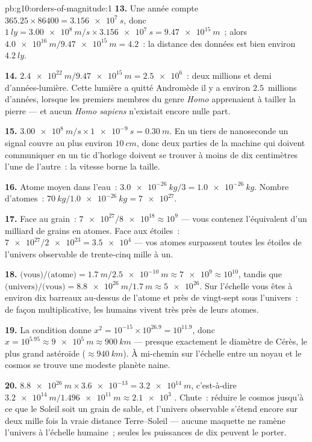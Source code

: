 \begin{solution}{pb:g10:orders-of-magnitude:1}
\textbf{13.} Une année compte $365.25 \times 86400 = \qty{3.156e7}{s}$,
donc $\qty{1}{ly} = \qty{3.00e8}{m/s} \times \qty{3.156e7}{s}
= \qty{9.47e15}{m}$~; alors
$\qty{4.0e16}{m}/\qty{9.47e15}{m} = 4.2$~: la distance des données est
bien environ $\qty{4.2}{ly}$.

\textbf{14.} $\qty{2.4e22}{m}/\qty{9.47e15}{m} = \num{2.5e6}$~: deux
millions et demi d'années-lumière. Cette lumière a quitté
Andromède il y a environ $2.5$~millions d'années, lorsque les premiers
membres du genre \emph{Homo} apprenaient à tailler la pierre --- et
aucun \emph{Homo sapiens} n'existait encore nulle part.

\textbf{15.} $\qty{3.00e8}{m/s} \times \qty{1e-9}{s} = \qty{0.30}{m}$.
En un tiers de nanoseconde un signal couvre au plus environ
$\qty{10}{cm}$, donc deux parties de la machine qui doivent
communiquer en un tic d'horloge doivent se trouver à moins de dix
centimètres l'une de l'autre~: la vitesse borne la taille.

\textbf{16.} Atome moyen dans l'eau~:
$\qty{3.0e-26}{kg}/3 = \qty{1.0e-26}{kg}$. Nombre d'atomes~:
$\qty{70}{kg}/\qty{1.0e-26}{kg} = \num{7e27}$.

\textbf{17.} Face au grain~:
$\num{7e27}/\num{8e18} \approx 10^{9}$ --- vous contenez l'équivalent
d'un milliard de grains en atomes. Face aux étoiles~:
$\num{7e27}/\num{2e23} = \num{3.5e4}$ --- vos atomes surpassent toutes
les étoiles de l'univers observable de trente-cinq mille à un.

\textbf{18.} $\text{(vous)}/\text{(atome)} =
\qty{1.7}{m}/\qty{2.5e-10}{m} \approx \num{7e9} \approx 10^{10}$,
tandis que $\text{(univers)}/\text{(vous)} =
\qty{8.8e26}{m}/\qty{1.7}{m} \approx \num{5e26}$. Sur l'échelle vous
êtes à environ dix barreaux au-dessus de l'atome et près de
vingt-sept sous l'univers~: de façon multiplicative, les humains
vivent très près de leurs atomes.

\textbf{19.} La condition donne
$x^{2} = 10^{-15} \times 10^{26.9} = 10^{11.9}$, donc
$x = 10^{5.95} \approx \qty{9e5}{m} \approx \qty{900}{km}$ ---
presque exactement le diamètre de Cérès, le plus grand astéroïde
($\approx \qty{940}{km}$). À mi-chemin sur l'échelle entre un noyau
et le cosmos se trouve une modeste planète naine.

\textbf{20.} $\qty{8.8e26}{m} \times \num{3.6e-13} = \qty{3.2e14}{m}$,
c'est-à-dire $\qty{3.2e14}{m}/\qty{1.496e11}{m} \approx \num{2.1e3}$
. Chute~: réduire le cosmos jusqu'à ce que
le Soleil soit un grain de sable, et l'univers observable s'étend
encore sur deux mille fois la vraie distance Terre--Soleil --- aucune
maquette ne ramène l'univers à l'échelle humaine~; seules les
puissances de dix peuvent le porter.
\end{solution}
